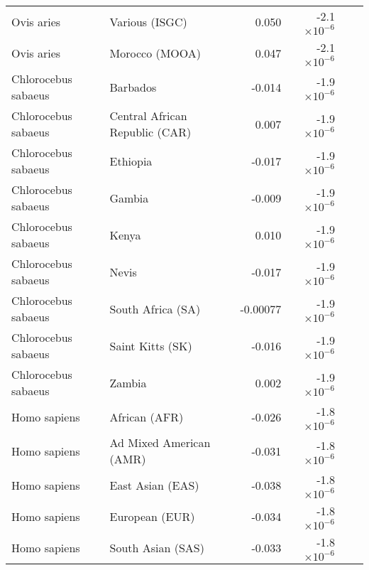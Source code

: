 \documentclass{article}
\begin{document}
\begin{table*}[!ht]
\begin{adjustbox}{width = 1\textwidth}
\begin{tabular}{|l|l|r|r|r|r|}
                Ovis aries          & Various (ISGC)                 & 0.050                 & -2.1$\times 10^{-6}$                 \\
                Ovis aries          & Morocco (MOOA)                 & 0.047                 & -2.1$\times 10^{-6}$                 \\
                Chlorocebus sabaeus & Barbados                       & -0.014                & -1.9$\times 10^{-6}$                 \\
                Chlorocebus sabaeus & Central African Republic (CAR) & 0.007                 & -1.9$\times 10^{-6}$                 \\
                Chlorocebus sabaeus & Ethiopia                       & -0.017                & -1.9$\times 10^{-6}$                 \\
                Chlorocebus sabaeus & Gambia                         & -0.009                & -1.9$\times 10^{-6}$                 \\
                Chlorocebus sabaeus & Kenya                          & 0.010                 & -1.9$\times 10^{-6}$                 \\
                Chlorocebus sabaeus & Nevis                          & -0.017                & -1.9$\times 10^{-6}$                 \\
                Chlorocebus sabaeus & South Africa (SA)              & -0.00077              & -1.9$\times 10^{-6}$                 \\
                Chlorocebus sabaeus & Saint Kitts (SK)               & -0.016                & -1.9$\times 10^{-6}$                 \\
                Chlorocebus sabaeus & Zambia                         & 0.002                 & -1.9$\times 10^{-6}$                 \\
                Homo sapiens        & African (AFR)                  & -0.026                & -1.8$\times 10^{-6}$                 \\
                Homo sapiens        & Ad Mixed American (AMR)        & -0.031                & -1.8$\times 10^{-6}$                 \\
                Homo sapiens        & East Asian (EAS)               & -0.038                & -1.8$\times 10^{-6}$                 \\
                Homo sapiens        & European (EUR)                 & -0.034                & -1.8$\times 10^{-6}$                 \\
                Homo sapiens        & South Asian (SAS)              & -0.033                & -1.8$\times 10^{-6}$                 \\
                \bottomrule
            \end{tabular}
        \end{adjustbox}
    \end{table*}

\end{document}
